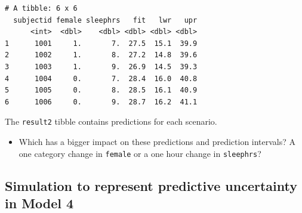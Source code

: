 \documentclass[]{book}
\newenvironment{Shaded}{\begin{snugshade}}{\end{snugshade}}
\newcommand{\KeywordTok}[1]{\textcolor[rgb]{0.13,0.29,0.53}{\textbf{#1}}}
\newcommand{\DataTypeTok}[1]{\textcolor[rgb]{0.13,0.29,0.53}{#1}}
\newcommand{\DecValTok}[1]{\textcolor[rgb]{0.00,0.00,0.81}{#1}}
\newcommand{\FloatTok}[1]{\textcolor[rgb]{0.00,0.00,0.81}{#1}}
\newcommand{\StringTok}[1]{\textcolor[rgb]{0.31,0.60,0.02}{#1}}
\newcommand{\OperatorTok}[1]{\textcolor[rgb]{0.81,0.36,0.00}{\textbf{#1}}}
\newcommand{\NormalTok}[1]{#1}
\providecommand{\tightlist}{%
  \setlength{\itemsep}{0pt}\setlength{\parskip}{0pt}}
\theoremstyle{definition}
\theoremstyle{definition}
\theoremstyle{definition}
\theoremstyle{remark}
\begin{document}
\begin{Shaded}
\end{Shaded}

\begin{verbatim}
# A tibble: 6 x 6
  subjectid female sleephrs   fit   lwr   upr
      <int>  <dbl>    <dbl> <dbl> <dbl> <dbl>
1      1001     1.       7.  27.5  15.1  39.9
2      1002     1.       8.  27.2  14.8  39.6
3      1003     1.       9.  26.9  14.5  39.3
4      1004     0.       7.  28.4  16.0  40.8
5      1005     0.       8.  28.5  16.1  40.9
6      1006     0.       9.  28.7  16.2  41.1
\end{verbatim}

The \texttt{result2} tibble contains predictions for each scenario.

\begin{itemize}
\tightlist
\item
  Which has a bigger impact on these predictions and prediction
  intervals? A one category change in \texttt{female} or a one hour
  change in \texttt{sleephrs}?
\end{itemize}

\subsection{Simulation to represent predictive uncertainty in Model
4}\label{simulation-to-represent-predictive-uncertainty-in-model-4}
\end{document}
